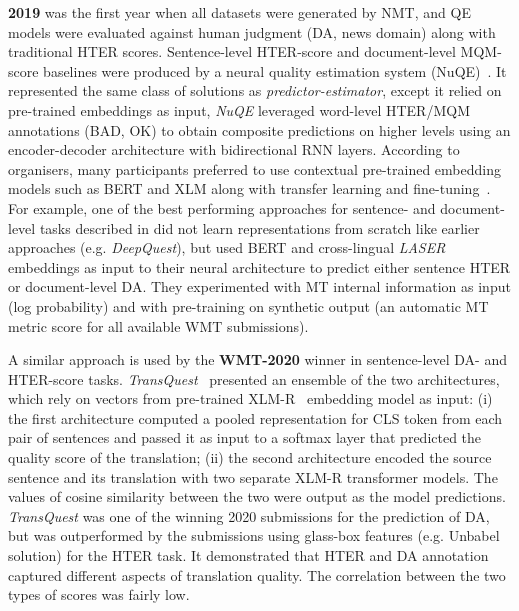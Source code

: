 \textbf{2019} was the first year when all datasets were generated by NMT, and QE models were evaluated against human judgment (DA, news domain) along with traditional HTER scores. %
Sentence-level HTER-score and document-level MQM-score baselines were produced by a neural quality estimation system (NuQE)~\cite{Martins2017}. It represented the same class of solutions as \textit{predictor-estimator}, except it relied on pre-trained embeddings as input, \textit{NuQE} leveraged word-level HTER/MQM annotations (BAD, OK) to obtain composite predictions on higher levels using an encoder-decoder architecture with bidirectional RNN layers. 
According to organisers, many participants preferred to use contextual pre-trained embedding models such as BERT and XLM along with transfer learning and fine-tuning~\cite{Fonseca2019}.
For example, one of the best performing approaches for sentence- and document-level tasks described in \citet{Yankovskaya2019} did not learn representations from scratch like earlier approaches (e.g. \textit{DeepQuest}), but used \gls{BERT} and cross-lingual \textit{LASER} embeddings as input to their neural architecture to predict either sentence HTER or document-level DA. They experimented with MT internal information as input (log probability) and with pre-training on synthetic output (an automatic MT metric score for all available WMT submissions).

A similar approach is used by the \textbf{WMT-2020} winner in sentence-level DA- and HTER-score tasks. \textit{TransQuest}~\cite{Ranasinghe2020} presented an ensemble of the two architectures, which rely on vectors from pre-trained \gls{XLM-R}~\cite{Conneau2020} embedding model as input: (i) the first architecture computed a pooled representation for CLS token from each pair of sentences and passed it as input to a softmax layer that predicted the quality score of the translation; (ii) the second architecture encoded the source sentence and its translation with two separate XLM-R transformer models. The values of cosine similarity between the two were output as the model predictions.
\textit{TransQuest} was one of the winning 2020 submissions for the prediction of DA, but was outperformed by the submissions using glass-box features (e.g. Unbabel solution) for the HTER task. It demonstrated that HTER and DA annotation captured different aspects of translation quality. The correlation between the two types of scores was fairly low.

